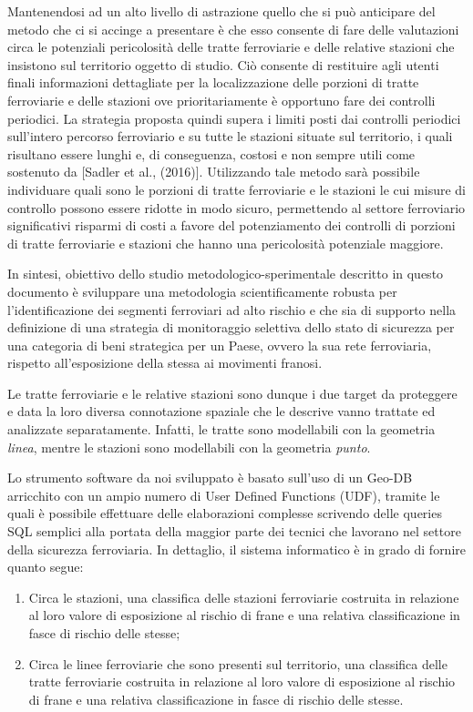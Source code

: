 Mantenendosi ad un alto livello di astrazione quello che si può anticipare del metodo che ci si accinge a presentare è che esso consente di fare delle valutazioni circa le potenziali pericolosità delle tratte ferroviarie e delle relative stazioni che insistono sul territorio oggetto di studio. Ciò consente di restituire agli utenti finali informazioni dettagliate per la localizzazione delle porzioni di tratte ferroviarie e delle stazioni ove prioritariamente è opportuno fare dei controlli periodici.
La strategia proposta quindi supera i limiti posti dai controlli periodici sull'intero percorso ferroviario e su tutte le stazioni situate sul territorio, i quali risultano essere lunghi e, di conseguenza, costosi e non sempre utili come sostenuto da [Sadler et al., (2016)]. Utilizzando tale metodo sarà possibile individuare quali sono le porzioni di tratte ferroviarie e le stazioni le cui misure di controllo possono essere ridotte in modo sicuro, permettendo al settore ferroviario significativi risparmi di costi a favore del potenziamento dei controlli di porzioni di tratte ferroviarie e stazioni che hanno una pericolosità potenziale maggiore.\newline

In sintesi, obiettivo dello studio metodologico-sperimentale descritto in questo documento è sviluppare una metodologia scientificamente robusta per l’identificazione dei segmenti ferroviari ad alto rischio e che sia di supporto nella definizione di una strategia di monitoraggio selettiva dello stato di sicurezza per una categoria di beni strategica per un Paese, ovvero la sua rete ferroviaria, rispetto all'esposizione della stessa ai movimenti franosi.\newline

Le tratte ferroviarie e le relative stazioni sono dunque i due target da proteggere e data la loro diversa connotazione spaziale che le descrive vanno trattate ed analizzate separatamente. Infatti, le tratte sono modellabili con la geometria \textit{linea}, mentre le stazioni sono modellabili con la geometria \textit{punto}.\newline

Lo strumento software da noi sviluppato è basato sull'uso di un Geo-DB arricchito con un ampio numero di User Defined Functions (UDF), tramite le quali è possibile effettuare delle elaborazioni complesse scrivendo delle queries SQL semplici alla portata della maggior parte dei tecnici che lavorano nel settore della sicurezza ferroviaria. In dettaglio, il sistema informatico è in grado di fornire quanto segue:
\begin{enumerate}
\item Circa le stazioni, una classifica delle stazioni ferroviarie costruita in relazione al loro valore di esposizione al rischio di frane e una relativa classificazione in fasce di rischio delle stesse;
\item Circa le linee ferroviarie che sono presenti sul territorio, una classifica delle tratte ferroviarie costruita in relazione al loro valore di esposizione al rischio di frane e una relativa classificazione in fasce di rischio delle stesse.
\end{enumerate}

